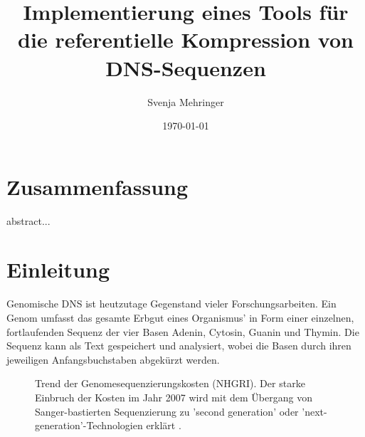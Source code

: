 \documentclass[12pt]{article}
\title{Implementierung eines Tools für die referentielle Kompression von DNS-Sequenzen}
\author{Svenja Mehringer}
\date{\today{}}
\begin{document}
\maketitle
\pagebreak
\tableofcontents
\pagebreak
\section{Zusammenfassung}
abstract...
\pagebreak
\section{Einleitung}

Genomische DNS ist heutzutage Gegenstand vieler Forschungsarbeiten. Ein Genom umfasst das gesamte Erbgut eines Organismus' in Form einer einzelnen, fortlaufenden Sequenz der vier Basen Adenin, Cytosin, Guanin und Thymin. Die Sequenz kann als Text gespeichert und analysiert, wobei die Basen durch ihren jeweiligen Anfangsbuchstaben abgekürzt werden.

\begin{figure}[b!]
\caption{\label{fig:costs}\footnotesize Trend der Genomesequenzierungskosten (NHGRI). Der starke Einbruch der Kosten im Jahr 2007 wird mit dem Übergang von Sanger-bastierten Sequenzierung zu 'second generation' oder 'next-generation'-Technologien erklärt \cite{sequencingCosts}.}
\end{figure}
\end{document}
